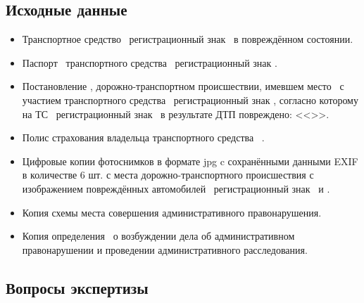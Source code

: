 \setcounter{page}{1}

	                                                       
\subsection{Исходные данные}


\begin{itemize}
\item Транспортное средство \tc\, регистрационный знак \,  в повреждённом состоянии.


\item  Паспорт  \,  транспортного средства   \, регистрационный знак .

\item  Постановление , дорожно-транспортном происшествии, имевшем место  \, с участием  транспортного средства \, регистрационный знак , согласно которому на ТС \, регистрационный знак \,  в результате ДТП повреждено:  << >>.  
 
\item  Полис страхования владельца транспортного средства \,   \polis.

\item  Цифровые копии фотоснимков в формате jpg c сохранёнными данными EXIF в количестве 6 шт.  с места дорожно-транспортного происшествия с изображением повреждённых автомобилей \, регистрационный знак  \, и \tcb.

\item  Копия схемы места совершения административного правонарушения.

\item  Копия определения \, о возбуждении дела об административном правонарушении и проведении административного расследования.
\end{itemize}                                      

\subsection{Вопросы  экспертизы}
      
